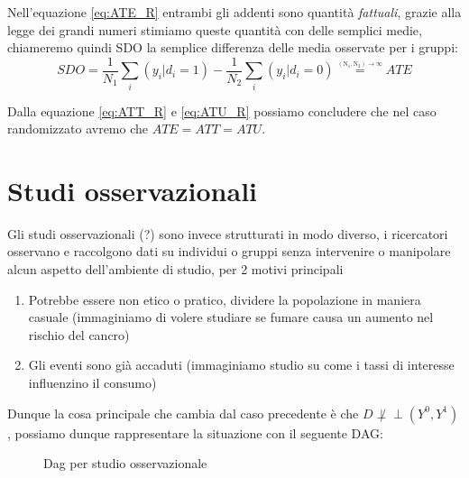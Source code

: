 Nell'equazione \ref{eq:ATE_R} entrambi gli addenti sono quantità \textit{fattuali}, grazie alla legge dei grandi numeri stimiamo queste quantità con delle semplici medie, chiameremo quindi SDO la semplice differenza delle media osservate per i gruppi:
$$SDO = \frac{1}{N_1}\sum_i(y_i|d_i=1) - \frac{1}{N_2}\sum_i(y_i|d_i=0) \overset{\underset{\mathrm{(N_1, N_2) \rightarrow \infty}}{}}{=} ATE$$

Dalla equazione \ref{eq:ATT_R} e \ref{eq:ATU_R} possiamo concludere che nel caso randomizzato avremo che $ATE = ATT = ATU$.


\section{Studi osservazionali}
Gli studi osservazionali (?) sono invece strutturati in modo diverso, i ricercatori osservano e raccolgono dati su individui o gruppi senza intervenire o manipolare alcun aspetto dell'ambiente di studio, per 2 motivi principali
\begin{enumerate}
\item Potrebbe essere non etico o pratico, dividere la popolazione in maniera casuale (immaginiamo di volere studiare se fumare causa un aumento nel rischio del cancro)
\item Gli eventi sono già accaduti (immaginiamo studio su come i tassi di interesse influenzino il consumo)
\end{enumerate}

Dunque la cosa principale che cambia dal caso precedente è che $D \not \perp\!\!\!\perp (Y^{0},Y^{1})$, possiamo dunque rappresentare la situazione con il seguente DAG:
\begin{figure}[!h]
\centering
\caption{Dag per studio osservazionale}
\label{fig:dag_OBS}
\end{figure}